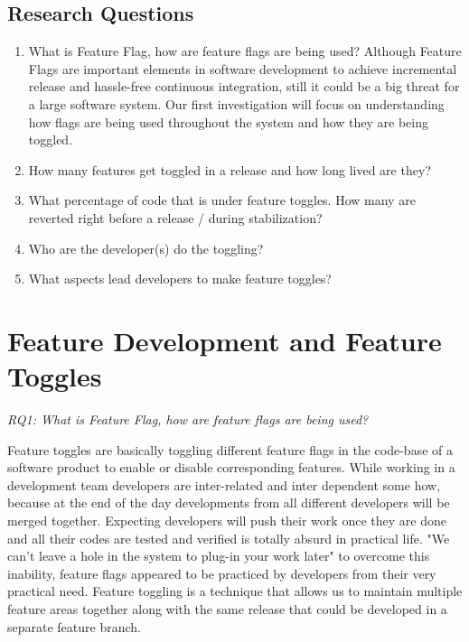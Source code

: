 \documentclass{acm_proc_article-sp}
\begin{document}
\subsection{Research Questions}

\renewcommand{\labelenumi}{RQ\theenumi:}
\begin{enumerate}
\item What is Feature Flag, how are feature flags are being used?\newline
Although Feature Flags are important elements in software development to achieve incremental release and hassle-free continuous integration, still it could be a big threat for a large software system. Our first investigation will focus on understanding how flags are being used throughout the system and how they are being toggled.
\item How many features get toggled in a release and how long lived are they?\newline
\item What percentage of code that is under feature toggles. How many are reverted right before a release / during stabilization?\newline
\item Who are the developer(s) do the toggling?\newline
\item What aspects lead developers to make feature toggles?\newline
\end{enumerate}

\section{Feature Development and Feature Toggles}

\textit{RQ1: What is Feature Flag, how are feature flags are being used?}

Feature toggles are basically toggling different feature flags in the code-base of a software product to enable or disable corresponding features. While working in a development team developers are inter-related and inter dependent some how, because at the end of the day developments from all different developers will be merged together. Expecting developers will push their work once they are done and all their codes are tested and verified is totally absurd in practical life. "We can't leave a hole in the system to plug-in your work later" to overcome this inability, feature flags appeared to be practiced by developers from their very practical need. Feature toggling is a technique that allows us to maintain multiple feature areas together along with the same release that could be developed in a separate feature branch.
\end{document}
